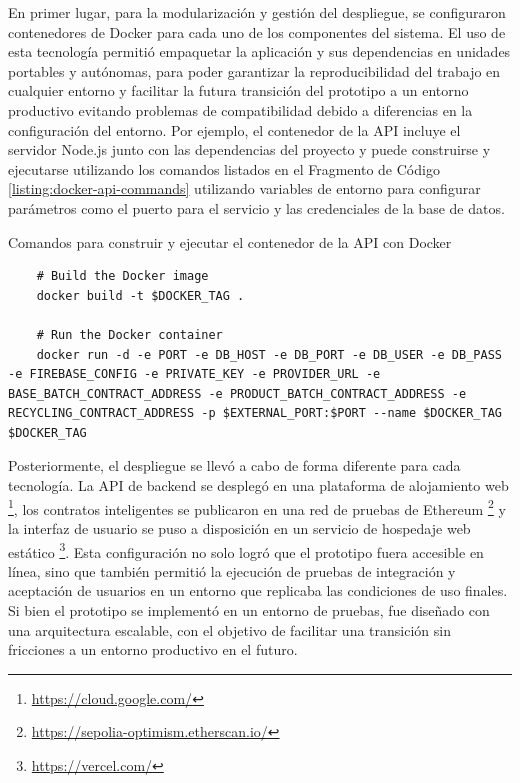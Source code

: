 En primer lugar, para la modularización y gestión del despliegue, se configuraron contenedores de Docker para cada uno de los componentes del sistema. El uso de esta tecnología permitió empaquetar la aplicación y sus dependencias en unidades portables y autónomas, para poder garantizar la reproducibilidad del trabajo en cualquier entorno y facilitar la futura transición del prototipo a un entorno productivo evitando problemas de compatibilidad debido a diferencias en la configuración del entorno. Por ejemplo, el contenedor de la API incluye el servidor Node.js junto con las dependencias del proyecto y puede construirse y ejecutarse utilizando los comandos listados en el Fragmento de Código \ref{listing:docker-api-commands} utilizando variables de entorno para configurar parámetros como el puerto para el servicio y las credenciales de la base de datos.

\begin{listing}[!htb]
\caption{Comandos para construir y ejecutar el contenedor de la API con Docker}
\label{listing:docker-api-commands}
\begin{verbatim}
	# Build the Docker image
	docker build -t $DOCKER_TAG .

	# Run the Docker container
	docker run -d -e PORT -e DB_HOST -e DB_PORT -e DB_USER -e DB_PASS -e FIREBASE_CONFIG -e PRIVATE_KEY -e PROVIDER_URL -e BASE_BATCH_CONTRACT_ADDRESS -e PRODUCT_BATCH_CONTRACT_ADDRESS -e RECYCLING_CONTRACT_ADDRESS -p $EXTERNAL_PORT:$PORT --name $DOCKER_TAG $DOCKER_TAG
\end{verbatim}
\end{listing}


Posteriormente, el despliegue se llevó a cabo de forma diferente para cada tecnología. La API de backend se desplegó en una plataforma de alojamiento web \footnote{\url{https://cloud.google.com/}}, los contratos inteligentes se publicaron en una red de pruebas de Ethereum \footnote{\url{https://sepolia-optimism.etherscan.io/}} y la interfaz de usuario se puso a disposición en un servicio de hospedaje web estático \footnote{\url{https://vercel.com/}}. Esta configuración no solo logró que el prototipo fuera accesible en línea, sino que también permitió la ejecución de pruebas de integración y aceptación de usuarios en un entorno que replicaba las condiciones de uso finales. Si bien el prototipo se implementó en un entorno de pruebas, fue diseñado con una arquitectura escalable, con el objetivo de facilitar una transición sin fricciones a un entorno productivo en el futuro.

